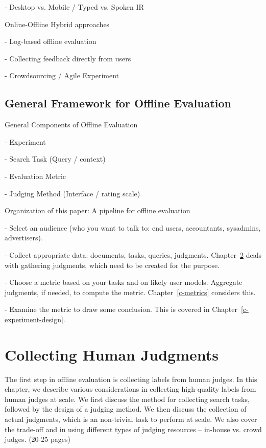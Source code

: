 \documentclass[openany]{now} %
\newcommand{\newpar}{\bigskip\noindent}
\begin{document}
-	Desktop vs. Mobile / Typed vs. Spoken IR \cite{VermaYC16}

\newpar
Online-Offline Hybrid approaches

- Log-based offline evaluation \cite{Li:2015} \cite{li2010contextual}

- Collecting feedback directly from users \cite{Kim2016}

- Crowdsourcing / Agile Experiment

\section{General Framework for Offline Evaluation}

General Components of Offline Evaluation

-	Experiment

-	Search Task (Query / context)

-	Evaluation Metric

-	Judging Method (Interface / rating scale) 

\newpar
Organization of this paper: A pipeline for offline evaluation

- Select an audience (who you want to talk to: end users, accountants, sysadmins, advertisers). 

- Collect appropriate data: documents, tasks, queries, judgments.  Chapter~\ref{c-human-judgment} deals with gathering judgments, which need to be created for the purpose.

- Choose a metric based on your tasks and on likely user models. Aggregate judgments, if needed, to compute the metric. Chapter~\ref{c-metrics} considers this.

- Examine the metric to draw some conclusion. This is covered in Chapter~\ref{c-experiment-design}.

\chapter{Collecting Human Judgments}
\label{c-human-judgment}

The first step in offline evaluation is collecting labels from human judges. In this chapter, we describe various considerations in collecting high-quality labels from human judges at scale. We first discuss the method for collecting search tasks, followed by the design of a judging method. We then discuss the collection of actual judgments, which is an non-trivial task to perform at scale. We also cover the trade-off and in using different types of judging resources -- in-house vs. crowd judges. (20-25 pages)
\end{document}
